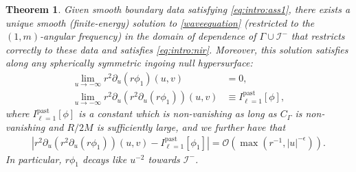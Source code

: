 \documentclass[11pt,english]{article}
\numberwithin{equation}{section}
\newtheorem{thm}{Theorem}[section]
\theoremstyle{remark}
\theoremstyle{plain}
\theoremstyle{remark}
\newcommand{\pu}{\partial_u}
\renewcommand{\(}{\left(}
\renewcommand{\)}{\right)}
\newcommand{\ILpn}[1]{I_{\ell=#1}^{\mathrm{past}}}
\begin{document}
	\begin{thm}\label{thm:intro:tl}
	Given smooth boundary data satisfying \eqref{eq:intro:ass1}, there exists a unique smooth (finite-energy) solution to \eqref{waveequation} (restricted to the $(1,m)$-angular frequency) in the domain of dependence of $\Gamma\cup \mathcal{I}^-$ that restricts correctly to these data and satisfies \eqref{eq:intro:nir}. Moreover, this solution satisfies along any spherically symmetric ingoing null hypersurface:
	\begin{align}
	\lim_{u\to-\infty}r^2\pu(r\phi_1)(u,v)&=0,\\
	\lim_{u\to-\infty}r^2\pu(r^2\pu(r\phi_1))(u,v)&\equiv \ILpn{1}[\phi],
	\end{align}
	where $\ILpn{1}[\phi]$ is a constant which is non-vanishing as long as $C_\Gamma$ is non-vanishing and $R/2M$ is sufficiently large, and we further have that
	\begin{align}
	\left|r^2\pu(r^2\pu(r\phi_1))(u,v) - \ILpn{1}[\phi_1]\right|=\mathcal{O}(\max(r^{-1}, |u|^{-\epsilon})).
	\end{align}
	In particular, $r\phi_1$ decays like $u^{-2}$ towards $\mathcal I^-$.
	\end{thm}
\end{document}
